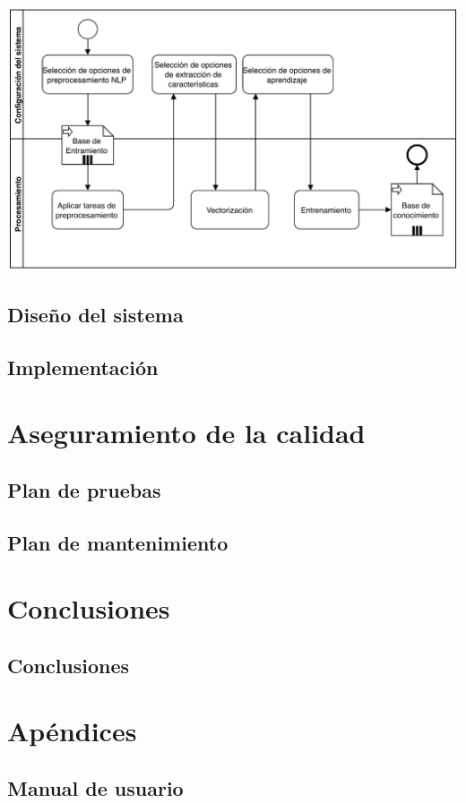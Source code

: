 \includegraphics[width=\textwidth]{bpmn-entrenamiento}



\chapter{Diseño del sistema}

\chapter{Implementación}

\part{Aseguramiento de la calidad}

\chapter{Plan de pruebas}

\chapter{Plan de mantenimiento}

\part{Conclusiones}

\chapter{Conclusiones}

\part{Apéndices}
\appendix

\chapter{Manual de usuario}

